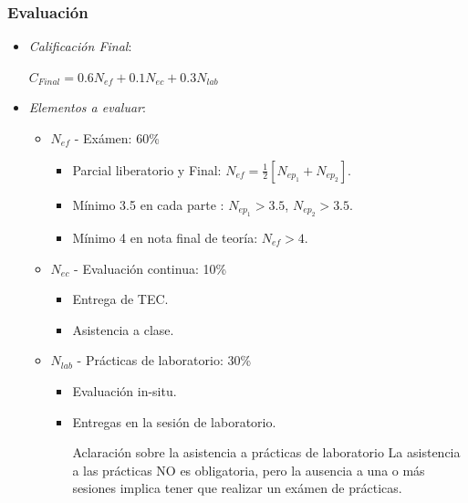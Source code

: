 \begin{frame}\frametitle{Evaluación}
  \vspace{0.2cm}
  \begin{itemize}
    \item \alert{\textit{Calificación Final}:}\\
    \begin{center}$C_{Final}=0.6 N_{ef} + 0.1 N_{ec} + 0.3 N_{lab}$\end{center}
    \item \alert{\textit{Elementos a evaluar}:}
    \begin{itemize}
      \item<2-> $N_{ef}$ - Exámen: \color{blue}60\%\color{black}
      \begin{itemize}
        \item Parcial liberatorio y Final: $N_{ef}=\frac{1}{2}[N_{ep_1}+N_{ep_2}]$.
        \item \color{red}Mínimo 3.5 en cada parte \color{black}: $N_{ep_1}>3.5$, $N_{ep_2}>3.5$.
        \item \color{red}Mínimo 4 en nota final de teoría: \color{black}$N_{ef}>4$.
      \end{itemize}
      \item<2-> $N_{ec}$ - Evaluación continua: \color{blue}10\%\color{black}
      \begin{itemize}
        \item Entrega de TEC.
        \item Asistencia a clase.
      \end{itemize}
      \item<2-> $N_{lab}$ - Prácticas de laboratorio: \color{blue}30\%\color{black}
      \begin{itemize}
        \item Evaluación in-situ.
        \item Entregas en la sesión de laboratorio.
        \begin{alertblock}{Aclaración sobre la asistencia a prácticas de laboratorio}
          \centering
          La asistencia a las prácticas NO es obligatoria, pero la ausencia a una o más sesiones implica tener que realizar un exámen de prácticas.
        \end{alertblock}
      \end{itemize}
    \end{itemize}
  \end{itemize}
\end{frame}

